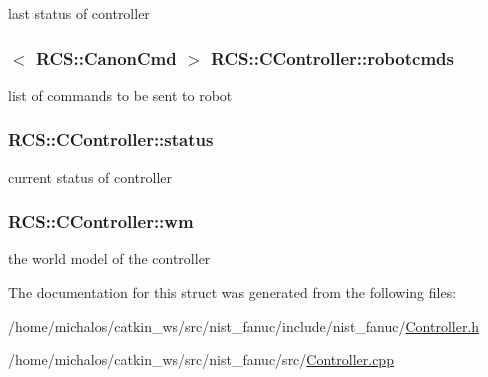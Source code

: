 last status of controller \hypertarget{structRCS_1_1CController_aa96c7961737b7e1cf5d8b4180f4bc399}{
\subsubsection[{robotcmds}]{$<$ {\bf R\-C\-S\-::\-Canon\-Cmd} $>$ R\-C\-S\-::\-C\-Controller\-::robotcmds\hspace{0.3cm}{\ttfamily [static]}}}\label{structRCS_1_1CController_aa96c7961737b7e1cf5d8b4180f4bc399}
list of commands to be sent to robot \hypertarget{structRCS_1_1CController_a82e9cc233cd25554964efe8a9008e0b2}{
\subsubsection[{status}]{ R\-C\-S\-::\-C\-Controller\-::status\hspace{0.3cm}{\ttfamily [static]}}}\label{structRCS_1_1CController_a82e9cc233cd25554964efe8a9008e0b2}
current status of controller \hypertarget{structRCS_1_1CController_a2b5d355e3e9d6195943ab148c1f94083}{
\subsubsection[{wm}]{ R\-C\-S\-::\-C\-Controller\-::wm\hspace{0.3cm}{\ttfamily [static]}}}\label{structRCS_1_1CController_a2b5d355e3e9d6195943ab148c1f94083}
the world model of the controller 

The documentation for this struct was generated from the following files\-:\begin{DoxyCompactItemize}
\item 
/home/michalos/catkin\-\_\-ws/src/nist\-\_\-fanuc/include/nist\-\_\-fanuc/\hyperlink{Controller_8h}{Controller.\-h}\item 
/home/michalos/catkin\-\_\-ws/src/nist\-\_\-fanuc/src/\hyperlink{Controller_8cpp}{Controller.\-cpp}\end{DoxyCompactItemize}
